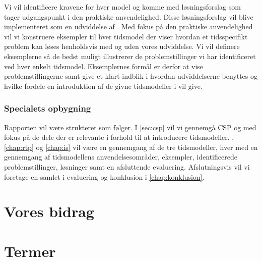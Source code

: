 Vi vil identificere kravene for hver model og komme med løsningsforslag som tager udgangspunkt i den praktiske anvendelighed. Disse løsningsforslag vil blive implementeret som en udviddelse af \pycsp. Med fokus på den praktiske anvendelighed vil vi konstruere eksempler til hver tidsmodel der viser hvordan et tidsspecifikt problem kan løses henholdsvis med og uden vores udviddelse. Vi vil definere eksemplerne så de bedst muligt illustrerer de problemstillinger vi har identificeret ved hver enkelt tidsmodel. Eksemplernes formål er derfor at vise problemstillingerne samt give et klart indblik i hvordan udviddelserne benyttes og hvilke fordele en introduktion af de givne tidsmodeller i \pycsp vil give. 

\subsubsection{Specialets opbygning}
Rapporten vil være strukteret som følger. I \autoref{sec:csp} vil vi gennemgå CSP og \pycsp med fokus på de dele der er relevante i forhold til at introducere tidsmodeller. 
, \ref{chap:rtp} og \ref{chap:is} vil være en gennemgang af de tre tidsmodeller, hver med en gennemgang af tidsmodellens anvendelsesområder, eksempler, identificerede problemstillinger, løsninger samt en afsluttende evaluering. Afslutningsvis vil vi foretage en samlet i evaluering og konklusion i \autoref{chap:konklusion}.




\section{Vores bidrag}
\section{Termer}

